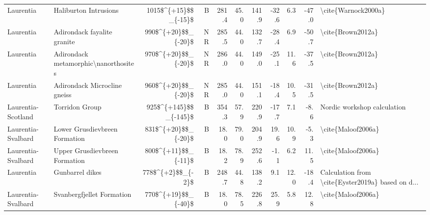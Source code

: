 \begin{longtable}{p{1 in}p{1 in}rrrrrrrr}
                     Laurentia &                            Haliburton Intrusions &   1015\$\textasciicircum \{+15\}\$\$\_\{-15\}\$ &      B &     281.4 &      45.0 & 141.9 & -32.6 &       6.3 &       -47.0 &                                \textbackslash cite\{Warnock2000a\} \\
                     Laurentia &                      Adirondack fayalite granite &    990\$\textasciicircum \{+20\}\$\$\_\{-20\}\$ &     NR &     285.5 &      44.0 & 132.7 & -28.4 &       6.9 &       -50.7 &                                  \textbackslash cite\{Brown2012a\} \\
                     Laurentia &             Adirondack metamorphic\textbackslash nanorthosites &    970\$\textasciicircum \{+20\}\$\$\_\{-20\}\$ &     NR &     286.0 &      44.0 & 149.0 & -25.1 &      11.6 &       -37.5 &                                  \textbackslash cite\{Brown2012a\} \\
                     Laurentia &                     Adirondack Microcline gneiss &    960\$\textasciicircum \{+20\}\$\$\_\{-20\}\$ &     NR &     285.0 &      44.0 & 151.1 & -18.4 &      10.5 &       -31.5 &                                  \textbackslash cite\{Brown2012a\} \\
            Laurentia-Scotland &                                   Torridon Group &  925\$\textasciicircum \{+145\}\$\$\_\{-145\}\$ &      B &     354.3 &      57.9 & 220.9 & -17.7 &       7.1 &        -8.6 &                        Nordic workshop calculation \\
            Laurentia-Svalbard &                    Lower Grusdievbreen Formation &    831\$\textasciicircum \{+20\}\$\$\_\{-20\}\$ &      B &      18.0 &      79.0 & 204.9 &  19.6 &      10.9 &        -5.3 &                                 \textbackslash cite\{Maloof2006a\} \\
            Laurentia-Svalbard &                    Upper Grusdievbreen Formation &    800\$\textasciicircum \{+11\}\$\$\_\{-11\}\$ &      B &      18.2 &      78.9 & 252.6 &  -1.1 &       6.2 &        11.5 &                                 \textbackslash cite\{Maloof2006a\} \\
                     Laurentia &                                  Gunbarrel dikes &      778\$\textasciicircum \{+2\}\$\$\_\{-2\}\$ &      B &     248.7 &      44.8 & 138.2 &   9.1 &      12.0 &       -18.4 &  Calculation from \textbackslash cite\{Eyster2019a\} based on d... \\
            Laurentia-Svalbard &                        Svanbergfjellet Formation &    770\$\textasciicircum \{+19\}\$\$\_\{-40\}\$ &      B &      18.0 &      78.5 & 226.8 &  25.9 &       5.8 &        12.8 &                                 \textbackslash cite\{Maloof2006a\} \\

\end{longtable}
